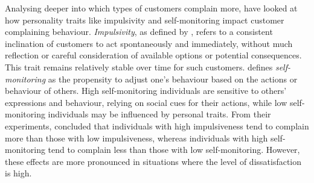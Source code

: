 \newline \newline
Analysing deeper into which types of customers complain more, \cite{sharma_complainers_2010} have looked at how personality traits like impulsivity and self-monitoring impact customer complaining behaviour. \textit{Impulsivity}, as defined by \cite{rookNormativeInfluencesImpulsive1995}, refers to a consistent inclination of customers to act spontaneously and immediately,  without much reflection or careful consideration of available options or potential consequences. This trait remains relatively stable over time for such customers. \cite{bechererSelfMonitoringModeratingVariable1978} defines \textit{self-monitoring} as the propensity to adjust one's behaviour based on the actions or behaviour of others. High self-monitoring individuals are sensitive to others' expressions and behaviour, relying on social cues for their actions, while low self-monitoring individuals may be influenced by personal traits. 
From their experiments, \cite{sharma_complainers_2010} concluded that individuals with high impulsiveness tend to complain more than those with low impulsiveness, whereas individuals with high self-monitoring tend to complain less than those with low self-monitoring. However, these effects are more pronounced in situations where the level of dissatisfaction is high. 


